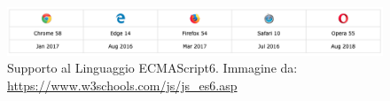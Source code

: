 \begin{figure}[H]
	\begin{center}
		\includegraphics[scale=0.4]{./images/ES6_Support.png}
		 \caption{Supporto al Linguaggio ECMAScript6. Immagine da: \url{https://www.w3schools.com/js/js_es6.asp}}
		 \label{SupportoECMAScript}
	\end{center}
\end{figure}

\pagebreak


